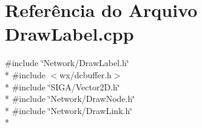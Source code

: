 \section{Referência do Arquivo Draw\+Label.\+cpp}
\label{_draw_label_8cpp}
{\ttfamily \#include \char`\"{}Network/\+Draw\+Label.\+h\char`\"{}}\\*
{\ttfamily \#include $<$wx/dcbuffer.\+h$>$}\\*
{\ttfamily \#include \char`\"{}S\+I\+G\+A/\+Vector2\+D.\+h\char`\"{}}\\*
{\ttfamily \#include \char`\"{}Network/\+Draw\+Node.\+h\char`\"{}}\\*
{\ttfamily \#include \char`\"{}Network/\+Draw\+Link.\+h\char`\"{}}\\*
